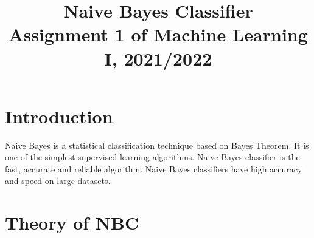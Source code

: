 \documentclass[10pt]{article}
\begin{document}
\noindent



\title{Naive Bayes Classifier\\Assignment 1 of Machine Learning I, 2021/2022}




\maketitle



\section{Introduction}
Naive Bayes is a statistical classification technique based on Bayes Theorem. It is one of the simplest supervised learning algorithms. Naive Bayes classifier is the fast, accurate and reliable algorithm. Naive Bayes classifiers have high accuracy and speed on large datasets.

\section{Theory of NBC}
\end{document}
